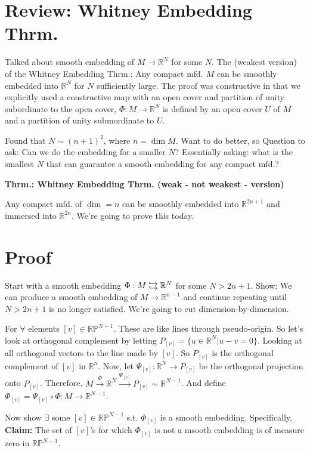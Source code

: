 \documentclass[12pt,letterpaper]{article}
\newcommand\dhookrightarrow{\mathrel{%
  \ensurestackMath{\stackanchor[.1ex]{\hookrightarrow}{\hookrightarrow}}
}}
\begin{document}
\section*{Review: Whitney Embedding Thrm.}

Talked about smooth embedding of $M \rightarrow \mathbb{R}^N$ for some $N$. The (weakest version) of the Whitney Embedding Thrm.: Any compact mfd. $M$ can be smoothly embedded into $\mathbb{R}^N$ for $N$ sufficiently large. The proof was constructive in that we explicitly used a constructive map with an open cover and partition of unity subordinate to the open cover, $\Phi: M \rightarrow \mathbb{R}^N$ is defined by an open cover $U$ of $M$ and a partition of unity submordinate to $U$. 

Found that $N \sim (n+1)^2$, where $n = \dim M$. Want to do better, so Question to ask: Can we do the embedding for a smaller $N$? Essentially asking: what is the smallest $N$ that can guarantee a smooth embedding for any compact mfd.?

\textbf{Thrm.: Whitney Embedding Thrm. (weak - not weakest - version)}

Any compact mfd. of $\dim = n$ can be smoothly embedded into $\mathbb{R}^{2n+1}$ and immersed into $\mathbb{R}^{2n}$. We're going to prove this today. 

\section{Proof}
Start with a smooth embedding $\Phi: M \dhookrightarrow{} \mathbb{R}^N$ for some $N > 2n + 1$. Show: We can produce a smooth embedding of $M \rightarrow \mathbb{R}^{n-1}$ and continue repeating until $N > 2n + 1$ is no longer satisfied.  We're going to cut dimension-by-dimension.

For $\forall $ elements $[v] \in \mathbb{R}\mathbb{P}^{N-1}$. These are like lines through pseudo-origin. So let's look at orthogonal complement by letting $P_{[v]} = \{ u \in \mathbb{R}^N | u - v = 0\}$. Looking at all orthogonal vectors to the line made by $[v]$. So $P_{[v]}$ is the orthogonal complement of $[v]$ in $\mathbb{R}^n$. Now, let $\Psi_{[v]}: \mathbb{R}^N \rightarrow P_{[v]}$ be the orthogonal projection onto $P_[v]$. Therefore, $M \xrightarrow{\Phi} \mathbb{R}^N \xrightarrow{\Psi_{[v]}} P_{[v]} \sim \mathbb{R}^{N-1}$. And define $\Phi_{[v]} = \Psi_{[v]} \circ \Phi : M \rightarrow \mathbb{R}^{N-1}$. 

Now show $\exists$ some $[v] \in \mathbb{R}\mathbb{P}^{N-1}$ s.t. $\Phi_{[v]}$ is a smooth embedding. Specifically, \textbf{Claim:} The set of $[v]$'s for which $\Phi_{[v]}$ is not a msooth embedding is of measure zero in $\mathbb{R}\mathbb{P}^{N-1}$.
\end{document}
